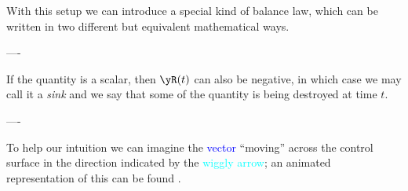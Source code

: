 With this setup we can introduce a special kind of balance law, which can be written in two different but equivalent mathematical ways.


----


If the quantity is a scalar, then $\yR(t)$ can also be negative, in which case we may call it a \emph{sink} and we say that some of the quantity is being destroyed at time $t$.


----

To help our intuition we can imagine the \textcolor{blue}{vector} \enquote{moving} across the \textcolor{midgrey}{control surface} in the direction indicated by the \textcolor{cyan}{wiggly arrow}; an animated representation of this can be found .



